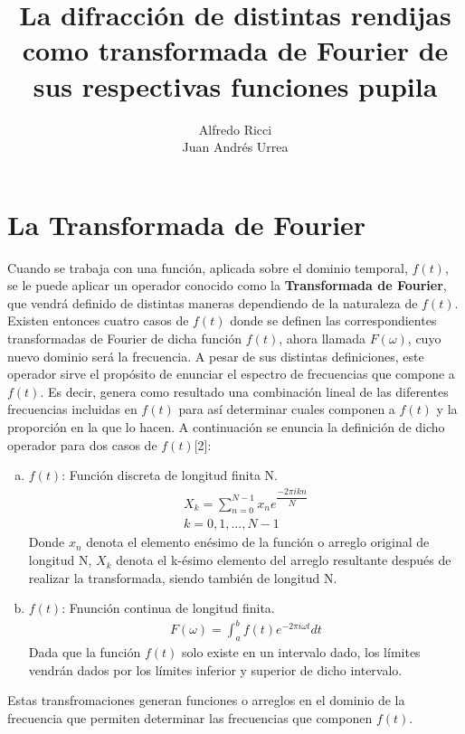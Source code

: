\documentclass{article}
\begin{document}
\title{\Large La difracción de distintas rendijas como transformada de Fourier de sus respectivas funciones pupila}
\author{Alfredo Ricci\\Juan Andrés Urrea}
\maketitle

\section{La Transformada de Fourier}
Cuando se trabaja con una función, aplicada sobre el dominio temporal, $f(t)$, se le puede aplicar un operador conocido como la \textbf{Transformada de Fourier}, que vendrá definido de distintas maneras dependiendo de la naturaleza de $f(t)$. Existen entonces cuatro casos de $f(t)$ donde se definen las correspondientes transformadas de Fourier de dicha función $f(t)$, ahora llamada $F(\omega)$, cuyo nuevo dominio será la frecuencia. A pesar de sus distintas definiciones, este operador sirve el propósito de enunciar el espectro de frecuencias que compone a $f(t)$. Es decir, genera como resultado una combinación lineal de las diferentes frecuencias incluidas en $f(t)$ para así determinar cuales componen a $f(t)$ y la proporción en la que lo hacen. A continuación se enuncia la definición de dicho operador para dos casos de $f(t)$[2]:
\begin{enumerate}[(a)]
\item $f(t)$: Función discreta de longitud finita N.
\begin{eqnarray*}
X_k=\sum_{n=0}^{N-1} x_n e^{\dfrac{-2\pi ikn}{N}}\\
k=0,1,...,N-1
\end{eqnarray*}
Donde $x_n$ denota el elemento enésimo de la función o arreglo original de longitud N, $X_k$ denota el k-ésimo elemento del arreglo resultante después de realizar la transformada, siendo también de longitud N. 

\item $f(t)$: Fnunción continua de longitud finita.
\begin{eqnarray*}
F(\omega)=\int_{a}^{b} f(t)e^{-2\pi i \omega t}dt
\end{eqnarray*}
Dada que la función $f(t)$ solo existe en un intervalo dado, los límites vendrán dados por los límites inferior y superior de dicho intervalo. 
\end{enumerate}
Estas transfromaciones generan funciones o arreglos en el dominio de la frecuencia que permiten determinar las frecuencias que componen $f(t)$. 
\end{document}
